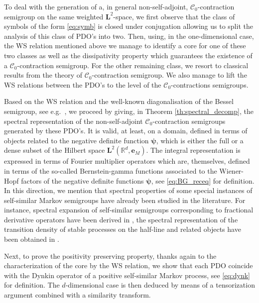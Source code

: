 \documentclass[12pt]{amsart}
\numberwithin{equation}{section}
\newcommand{\bb}{\mathbb}
\newcommand{\cc}{\mathcal}
\newcommand{\bmrm}[2][2]{\mathbf{#2}^{#1}}
\theoremstyle{definition}
\theoremstyle{assump}
\theoremstyle{remark}
\begin{document}
To deal with the generation of a, in general non-self-adjoint, $\cc{C}_0$-contraction semigroup on the same  weighted $\bmrm{L}$-space, we first observe that the class of symbols of the form \eqref{eq:symb} is closed under conjugation allowing us to split the analysis of this class of PDO's into two. Then, using, in the one-dimensional case, the WS relation mentioned above  we manage to identify a core for one of these two classes as well as the dissipativity property which guarantees the existence of a $\cc{C}_0$-contraction semigroup. For the other remaining class, we resort to classical results from the theory of $\cc{C}_0$-contraction semigroup.
We also manage to lift the WS relations between the PDO's to the level of the $\cc{C}_0$-contractions semigroups.

Based on the WS relation and the well-known diagonalisation of the Bessel semigroup, see e.g.~\cite{MuS}, we proceed by giving, in Theorem \ref{th:spectral_decomp}, the spectral representation of the non-self-adjoint $\cc{C}_0$-contraction semigroups generated by these PDO's. It  is valid, at least, on a domain, defined in terms of objects related to the negative definite function $\bm{\psi}$, which is either the full or a dense subset of the Hilbert space $\bmrm{L}(\bb{R}^d,{\mathbf{e}}_M)$. The integral representation is expressed in terms of Fourier multiplier operators which are, themselves,  defined in terms of the so-called Bernstein-gamma functions associated to the Wiener-Hopf factors of the negative definite functions $\bm{\psi}$, see \eqref{eq:BG_receq} for definition. In this direction, we mention that spectral properties of some special instances  of self-similar Markov semigroups have already been studied in the literature. For instance, spectral expansion of self-similar semigroups corresponding to fractional derivative operators have been derived in \cite{patie_zhao2017}, the spectral representation of the transition density of stable processes on the half-line and related objects have  been  obtained in \cite{kK, kw,kw1, Mu}.

Next, to prove the positivity preserving property, thanks again to the characterization of the core by the WS relation, we show that each  PDO coincide with the Dynkin  operator of  a positive self-similar Markov process, see  \eqref{eq:dynk} for definition.  %
The $d$-dimensional case is then deduced by means of a tensorization argument combined with a similarity transform.
\end{document}
